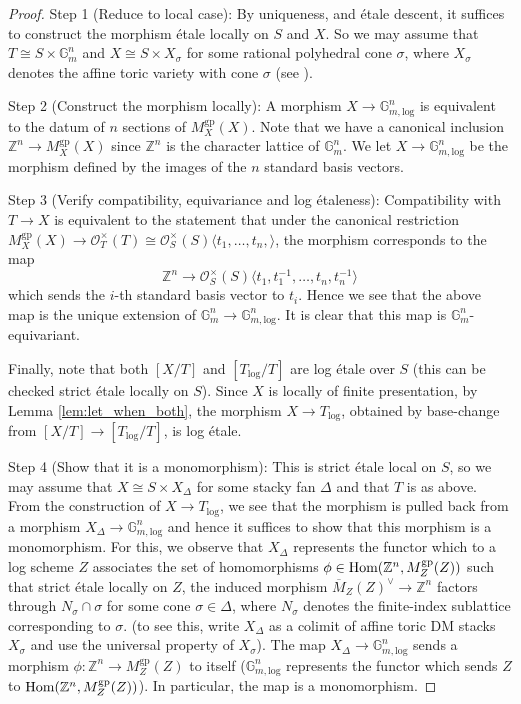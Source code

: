 \documentclass[11pt]{amsart}
\theoremstyle{definition}
\theoremstyle{remark}
\def\log{\mathrm{log}}
\def\gp{\mathrm{gp}}
\DeclareMathOperator{\Hom}{\textup{Hom}}
\begin{document}
\begin{proof}
	Step 1 (Reduce to local case): By uniqueness, \cite[Theorem 1.1 (3)]{fortman2025descentalgebraicstacks} and étale descent,
	it suffices to construct the morphism étale locally on $S$
	and $X$.
	So we may assume that $T\cong S\times \mathbb{G}_{m}^{n}$
	and $X\cong S\times X_{\sigma}$ for some rational polyhedral cone $\sigma$, where
	$X_{\sigma}$ denotes the affine toric variety with
	cone $\sigma$ (see \cite[Proposition 2.6.4]{ATheoryOfStaGillam2015}).

	Step 2 (Construct the morphism locally): A morphism $X\to \mathbb{G}_{m,\log}^{n}$ is equivalent to the
	datum of $n$ sections of $M_X^{\gp}(X)$. Note that we
	have a canonical inclusion $\mathbb{Z}^{n}\to M_X^{\gp}(X)$
	since $\mathbb{Z}^{n}$ is the character lattice of $\mathbb{G}_{m}^{n}$.
	We let $X\to \mathbb{G}_{m,\log}^{n}$ be the morphism defined
	by the images of the $n$ standard basis vectors.

	Step 3 (Verify compatibility, equivariance and log étaleness): Compatibility
	with $T\to X$ is equivalent to the statement that under the canonical
	restriction $M_X^{\gp}(X)\to \mathcal{O}_T^{\times}(T)\cong \mathcal{O}_S^{\times}(S)\langle t_1,\dots,t_n,\rangle$,
	the morphism corresponds to the map
	$$\mathbb{Z}^{n}\to \mathcal{O}_S^{\times}(S)\langle t_1,t_1^{-1},\dots,t_n,t_n^{-1}\rangle$$
	which sends the $i$-th standard basis vector to $t_i$. Hence we see that the above map is the unique extension
	of $\mathbb{G}_{m}^{n}\to \mathbb{G}_{m,\log}^{n}$. It is clear that this map is $\mathbb{G}_{m}^{n}$-equivariant.

	Finally, note that both $[X/T]$ and $[T_{\log}/T]$ are log étale over $S$ (this can be checked strict étale locally on $S$). Since $X$ is locally of finite presentation, by Lemma \ref{lem:let_when_both},
	the morphism $X\to T_{\log}$, obtained by base-change from $[X/T]\to [T_{\log}/T]$, is log étale.

	Step 4 (Show that it is a monomorphism): This is strict étale local on $S$, so we may assume that $X\cong S\times X_{\Delta}$
	for some stacky fan $\Delta$ and that $T$ is as above. From the construction of $X\to T_{\log}$, we see that the
	morphism is pulled back from a morphism $X_{\Delta}\to \mathbb{G}_{m,\log}^{n}$ and hence it suffices to show that
	this morphism is a monomorphism. For this, we observe that $X_{\Delta}$ represents the functor which to
	a log scheme $Z$ associates the set of homomorphisms $\phi\in \Hom(\mathbb{Z}^{n},M_Z^{\gp}(Z))$ such that strict
	étale locally on $Z$, the induced morphism $\overline{M}_Z(Z)^{\vee}\to \mathbb{Z}^{n}$ factors through $N_{\sigma}\cap \sigma$
	for some cone $\sigma\in \Delta$, where $N_{\sigma}$ denotes the
	finite-index sublattice corresponding to $\sigma$.
	(to see this, write $X_{\Delta}$ as a colimit of affine toric DM stacks $X_{\sigma}$ and use the universal property
	of $X_{\sigma}$). The map $X_{\Delta}\to \mathbb{G}_{m,\log}^{n}$ sends a morphism $\phi:\mathbb{Z}^{n}\to M_Z^{\gp}(Z)$
	to itself ($\mathbb{G}_{m,\log}^{n}$ represents the functor which sends $Z$ to $\Hom(\mathbb{Z}^{n},M_Z^{\gp}(Z))$).
	In particular, the map is a monomorphism.


\end{proof}
\end{document}
